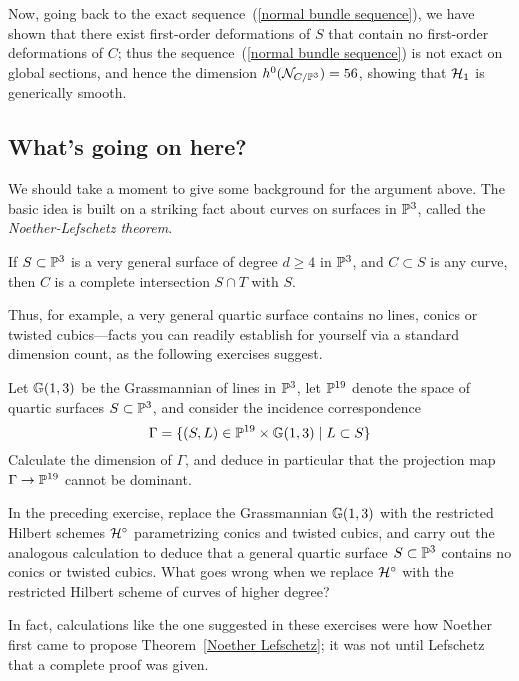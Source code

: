 Now, going back to the exact sequence~(\ref{normal bundle sequence}), we have shown that there exist first-order deformations of $S$ that contain no first-order deformations of $C$; thus the sequence~(\ref{normal bundle sequence}) is not exact on global sections, and hence the dimension $h^0(\cN_{C/\PP^3}) = 56$, showing that $\cH_1$ is generically smooth.

\subsection{What's going on here?}

We should take a moment to give some background for the  argument above. The basic idea is built on a striking fact about curves on surfaces in $\PP^3$, called the \emph{Noether-Lefschetz theorem}.

\begin{theorem}\label{Noether Lefschetz}
If $S \subset \PP^3$ is a very general surface of degree $d \geq 4$ in $\PP^3$, and $C \subset S$ is any curve, then $C$ is a complete intersection $S \cap T$ with $S$.
\end{theorem}

Thus, for example, a very general quartic surface contains no lines, conics or twisted cubics---facts you can readily establish for yourself via a standard dimension count, as the following exercises suggest.

\begin{exercise}
Let $\GG(1,3)$ be the Grassmannian of lines in $\PP^3$, let $\PP^{19}$ denote the space of quartic surfaces $S \subset \PP^3$, and consider the incidence correspondence
$$
\Gamma = \{ (S, L) \in \PP^{19} \times \GG(1,3) \mid L \subset S \}
$$
Calculate the dimension of $\Gamma$, and deduce in particular that the projection map $\Gamma \to \PP^{19}$ cannot be dominant.
\end{exercise} 


\begin{exercise} In the preceding exercise, replace the Grassmannian $\GG(1,3)$ with the restricted Hilbert schemes $\cH^\circ$ parametrizing conics and twisted cubics, and carry out the analogous calculation to deduce that a general quartic surface $S \subset \PP^3$ contains no conics or twisted cubics. What goes wrong when we replace $\cH^\circ$ with the restricted Hilbert scheme of curves of higher degree?
\end{exercise} 

In fact, calculations like the one suggested in these exercises were how Noether first came to propose Theorem~\ref{Noether Lefschetz}; it was not until Lefschetz that a complete proof was given.

